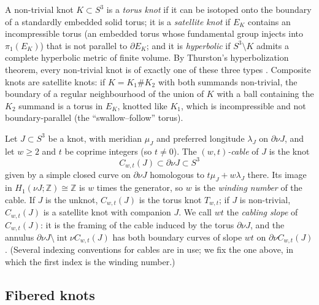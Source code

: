 \documentclass[12pt]{article}
\newcommand{\Z}{\mathbb Z}
\newcommand{\Int}{\operatorname{int}}
\newcommand{\nbd}{\nu}
\theoremstyle{definition}
\theoremstyle{remark}
\begin{document}
A non-trivial knot \(K\subset S^3\) is a \emph{torus knot} if it can be
isotoped onto the boundary of a standardly embedded solid torus; it is a
\emph{satellite knot} if \(E_K\) contains an incompressible torus (an
embedded torus whose fundamental group injects into \(\pi_1(E_K)\)) that
is not parallel to \(\partial E_K\); and it is \emph{hyperbolic} if
\(S^3\setminus K\) admits a complete hyperbolic metric of finite volume.
By Thurston's hyperbolization theorem, every non-trivial knot is of
exactly one of these three types \cite[Corollary~2.5]{Thurston1982}.
Composite knots are satellite knots: if \(K=K_1\#K_2\) with both
summands non-trivial, the boundary of a regular neighbourhood of the
union of \(K\) with a ball containing the \(K_2\) summand is a torus in
\(E_K\), knotted like \(K_1\), which is incompressible and not
boundary-parallel (the ``swallow--follow'' torus).

Let \(J\subset S^3\) be a knot, with meridian \(\mu_J\) and preferred
longitude \(\lambda_J\) on \(\partial\nbd J\), and let \(w\geq2\) and
\(t\) be coprime integers (so \(t\neq0\)). The \emph{\((w,t)\)-cable} of
\(J\) is the knot
\[
 C_{w,t}(J)\subset\partial\nbd J\subset S^3
\]
given by a simple closed curve on \(\partial\nbd J\) homologous to
\(t\mu_J+w\lambda_J\) there. Its image in \(H_1(\nbd J;\Z)\cong\Z\) is
\(w\) times the generator, so \(w\) is the \emph{winding number} of the
cable. If \(J\) is the unknot, \(C_{w,t}(J)\) is the torus knot
\(T_{w,t}\); if \(J\) is non-trivial, \(C_{w,t}(J)\) is a satellite knot
with companion \(J\). We call \(wt\) the \emph{cabling slope} of
\(C_{w,t}(J)\): it is the framing of the cable induced by the torus
\(\partial\nbd J\), and the annulus
\(\partial\nbd J\setminus\Int\nbd C_{w,t}(J)\) has both boundary curves of
slope \(wt\) on \(\partial\nbd C_{w,t}(J)\). (Several indexing
conventions for cables are in use; we fix the one above, in which the
first index is the winding number.)

\subsection{Fibered knots}\label{sec:fibered}
\end{document}
